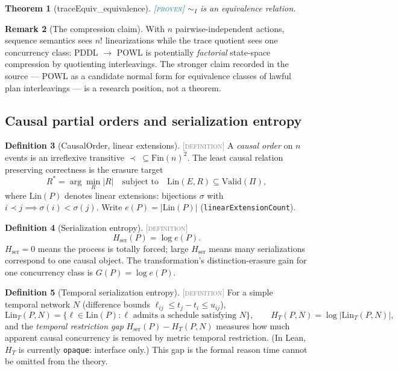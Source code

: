 \documentclass[11pt]{article}
\newcommand{\PROVEN}{\textcolor{teal}{\textsc{[proven]}}}
\newcommand{\DEFINITION}{\textcolor{gray}{\textsc{[definition]}}}
\newcommand{\PT}{\Pi}                          %
\newcommand{\traceEq}[1]{\sim_{#1}}            %
\newcommand{\Lin}{\mathrm{Lin}}
\newcommand{\Hser}{H_{\mathrm{ser}}}
\theoremstyle{plain}
\newtheorem{theorem}{Theorem}[section]
\theoremstyle{definition}
\newtheorem{definition}[theorem]{Definition}
\newtheorem{remark}[theorem]{Remark}
\begin{document}
\begin{theorem}[traceEquiv\_equivalence]\PROVEN\;
$\traceEq{I}$ is an equivalence relation.
\end{theorem}

\begin{remark}[The compression claim]
With $n$ pairwise-independent actions, sequence semantics sees $n!$
linearizations while the trace quotient sees one concurrency class:
PDDL $\to$ POWL is potentially \emph{factorial} state-space compression by
quotienting interleavings. The stronger claim recorded in the source --- POWL
as a candidate normal form for equivalence classes of lawful plan
interleavings --- is a research position, not a theorem.
\end{remark}

\subsection{Causal partial orders and serialization entropy}

\begin{definition}[CausalOrder, linear extensions]\DEFINITION\;
A \emph{causal order} on $n$ events is an irreflexive transitive
$\prec\ \subseteq \mathrm{Fin}(n)^2$. The least causal relation preserving
correctness is the erasure target
\[
  R^{*} = \arg\min_{R} |R|
  \quad\text{subject to}\quad
  \Lin(E, R) \subseteq \mathrm{Valid}(\PT),
\]
where $\Lin(P)$ denotes linear extensions: bijections
$\sigma$ with $i \prec j \implies \sigma(i) < \sigma(j)$. Write
$e(P) = |\Lin(P)|$ (\texttt{linearExtensionCount}).
\end{definition}

\begin{definition}[Serialization entropy]\DEFINITION\;
\[
  \Hser(P) = \log e(P).
\]
$\Hser = 0$ means the process is totally forced; large $\Hser$ means many
serializations correspond to one causal object. The transformation's
distinction-erasure gain for one concurrency class is $G(P) = \log e(P)$.
\end{definition}

\begin{definition}[Temporal serialization entropy]\DEFINITION\;
For a simple temporal network $N$ (difference bounds
$\ell_{ij} \le t_j - t_i \le u_{ij}$),
\[
  \Lin_T(P, N) = \{\ell \in \Lin(P) : \ell \text{ admits a schedule satisfying } N\},
  \qquad
  H_T(P, N) = \log|\Lin_T(P, N)| ,
\]
and the \emph{temporal restriction gap}
$\Hser(P) - H_T(P,N)$ measures how much apparent causal concurrency is
removed by metric temporal restriction. (In Lean, $H_T$ is currently
\texttt{opaque}: interface only.) This gap is the formal reason time cannot
be omitted from the theory.
\end{definition}
\end{document}
